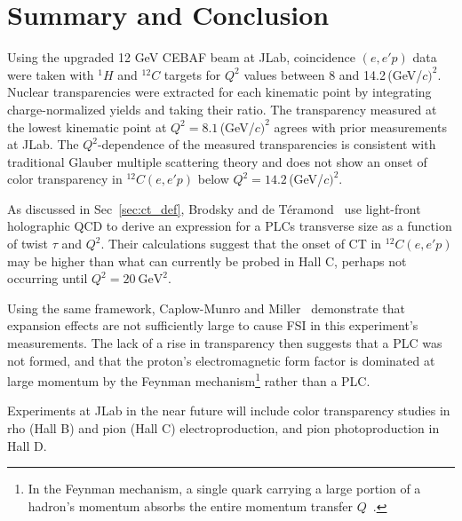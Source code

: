 \chapter{Summary and Conclusion}
Using the upgraded 12\,\,GeV CEBAF beam at JLab, coincidence $(e,e'p)$ data
were taken with $^{1}H$ and $^{12}C$ targets for $Q^2$ values between 8 and
14.2\,(GeV/$c)^2$.
Nuclear transparencies were extracted for each kinematic point by integrating
charge-normalized yields and taking their ratio.
The transparency measured at the lowest kinematic point at
$Q^2=8.1$\,(GeV/$c)^2$ agrees with prior measurements at JLab.
The $Q^2$-dependence of the measured transparencies is consistent with
traditional Glauber multiple scattering theory and does not show an onset of
color transparency in $^{12}C(e,e'p)$ below $Q^2=14.2$\,(GeV/$c)^2$.

As discussed in Sec~\ref{sec:ct_def}, Brodsky and de Téramond~\cite{Brodsky_2021}
use light-front holographic QCD to derive an expression for a PLCs transverse
size as a function of twist $\tau$ and $Q^2$.
Their calculations suggest that the onset of CT in ${}^{12}C(e,e'p)$ may be
higher than what can currently be probed in Hall C, perhaps not occurring
until $Q^2=\SI{20}{\giga\electronvolt\squared}$.

Using the same framework, Caplow-Munro and Miller~\cite{CaplowMunro_2021}
demonstrate that expansion effects are not sufficiently large to cause FSI in
this experiment's measurements.
The lack of a rise in transparency then suggests that a PLC was not formed,
and that the proton's electromagnetic form factor is dominated at large
momentum by the Feynman mechanism\footnote{In the Feynman mechanism, a single
quark carrying a large portion of a hadron's momentum absorbs the entire
momentum transfer $Q$~\cite{Drell_1970}.} rather than a PLC.

Experiments at JLab in the near future will include color transparency studies
in rho (Hall B) and pion (Hall C) electroproduction, and pion photoproduction
in Hall D.
